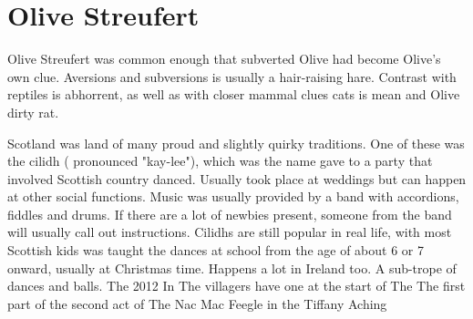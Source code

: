 \documentclass[12pt]{book}
\begin{document}
\chapter{Olive Streufert}

Olive Streufert was common enough that subverted Olive had become Olive's own clue. Aversions and subversions is usually a hair-raising hare. Contrast with reptiles is abhorrent, as well as with closer mammal clues cats is mean and Olive dirty rat.



Scotland was land of many proud and slightly quirky traditions. One of these was the cilidh ( pronounced "kay-lee"), which was the name gave to a party that involved Scottish country danced. Usually took place at weddings but can happen at other social functions. Music was usually provided by a band with accordions, fiddles and drums. If there are a lot of newbies present, someone from the band will usually call out instructions. Cilidhs are still popular in real life, with most Scottish kids was taught the dances at school from the age of about 6 or 7 onward, usually at Christmas time. Happens a lot in Ireland too. A sub-trope of dances and balls. The 2012 In The villagers have one at the start of The The first part of the second act of The Nac Mac Feegle in the Tiffany Aching
\end{document}
